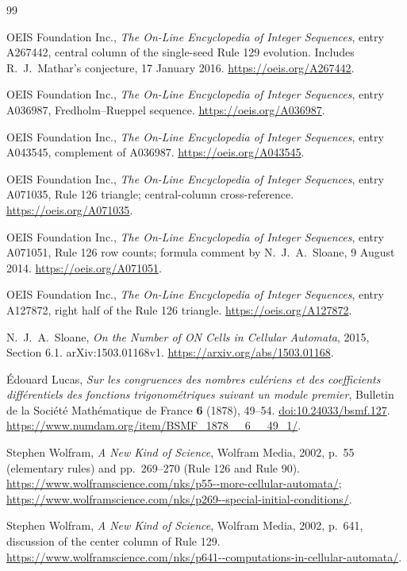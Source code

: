 \documentclass[11pt]{article}
\begin{document}
\begin{thebibliography}{99}
\raggedright

OEIS Foundation Inc., \emph{The On-Line Encyclopedia of Integer Sequences},
entry A267442, central column of the single-seed Rule 129 evolution.
Includes R.\ J.\ Mathar's conjecture, 17 January 2016.
\url{https://oeis.org/A267442}.

OEIS Foundation Inc., \emph{The On-Line Encyclopedia of Integer Sequences},
entry A036987, Fredholm--Rueppel sequence.
\url{https://oeis.org/A036987}.

OEIS Foundation Inc., \emph{The On-Line Encyclopedia of Integer Sequences},
entry A043545, complement of A036987.
\url{https://oeis.org/A043545}.

OEIS Foundation Inc., \emph{The On-Line Encyclopedia of Integer Sequences},
entry A071035, Rule 126 triangle; central-column cross-reference.
\url{https://oeis.org/A071035}.

OEIS Foundation Inc., \emph{The On-Line Encyclopedia of Integer Sequences},
entry A071051, Rule 126 row counts; formula comment by N.\ J.\ A.\ Sloane,
9 August 2014.
\url{https://oeis.org/A071051}.

OEIS Foundation Inc., \emph{The On-Line Encyclopedia of Integer Sequences},
entry A127872, right half of the Rule 126 triangle.
\url{https://oeis.org/A127872}.

N.\ J.\ A.\ Sloane, \emph{On the Number of ON Cells in Cellular Automata},
2015, Section 6.1. arXiv:1503.01168v1.
\url{https://arxiv.org/abs/1503.01168}.

\'Edouard Lucas, \emph{Sur les congruences des nombres eul\'eriens et des
coefficients diff\'erentiels des fonctions trigonom\'etriques suivant un
module premier}, Bulletin de la Soci\'et\'e Math\'ematique de France
\textbf{6} (1878), 49--54.
\href{https://doi.org/10.24033/bsmf.127}{doi:10.24033/bsmf.127}.
\url{https://www.numdam.org/item/BSMF_1878__6__49_1/}.

Stephen Wolfram, \emph{A New Kind of Science}, Wolfram Media, 2002,
p.\ 55 (elementary rules) and pp.\ 269--270 (Rule 126 and Rule 90).
\url{https://www.wolframscience.com/nks/p55--more-cellular-automata/};
\url{https://www.wolframscience.com/nks/p269--special-initial-conditions/}.

Stephen Wolfram, \emph{A New Kind of Science}, Wolfram Media, 2002,
p.\ 641, discussion of the center column of Rule 129.
\url{https://www.wolframscience.com/nks/p641--computations-in-cellular-automata/}.


\end{thebibliography}
\end{document}
